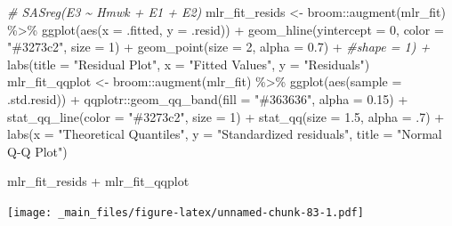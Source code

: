 \documentclass[
]{book}
\newenvironment{Shaded}{\begin{snugshade}}{\end{snugshade}}
\newcommand{\AttributeTok}[1]{\textcolor[rgb]{0.77,0.63,0.00}{#1}}
\newcommand{\CommentTok}[1]{\textcolor[rgb]{0.56,0.35,0.01}{\textit{#1}}}
\newcommand{\DecValTok}[1]{\textcolor[rgb]{0.00,0.00,0.81}{#1}}
\newcommand{\FloatTok}[1]{\textcolor[rgb]{0.00,0.00,0.81}{#1}}
\newcommand{\FunctionTok}[1]{\textcolor[rgb]{0.00,0.00,0.00}{#1}}
\newcommand{\NormalTok}[1]{#1}
\newcommand{\OtherTok}[1]{\textcolor[rgb]{0.56,0.35,0.01}{#1}}
\newcommand{\SpecialCharTok}[1]{\textcolor[rgb]{0.00,0.00,0.00}{#1}}
\newcommand{\StringTok}[1]{\textcolor[rgb]{0.31,0.60,0.02}{#1}}
\begin{document}
\begin{Shaded}
\begin{Highlighting}[]
\CommentTok{\# SASreg(E3 \textasciitilde{} Hmwk + E1 + E2)}
\NormalTok{mlr\_fit\_resids }\OtherTok{\textless{}{-}}\NormalTok{ broom}\SpecialCharTok{::}\FunctionTok{augment}\NormalTok{(mlr\_fit) }\SpecialCharTok{\%\textgreater{}\%} 
  \FunctionTok{ggplot}\NormalTok{(}\FunctionTok{aes}\NormalTok{(}\AttributeTok{x =}\NormalTok{ .fitted, }\AttributeTok{y =}\NormalTok{ .resid)) }\SpecialCharTok{+} 
  \FunctionTok{geom\_hline}\NormalTok{(}\AttributeTok{yintercept =} \DecValTok{0}\NormalTok{, }\AttributeTok{color =} \StringTok{"\#3273c2"}\NormalTok{, }\AttributeTok{size =} \DecValTok{1}\NormalTok{) }\SpecialCharTok{+}
  \FunctionTok{geom\_point}\NormalTok{(}\AttributeTok{size =} \DecValTok{2}\NormalTok{, }\AttributeTok{alpha =} \FloatTok{0.7}\NormalTok{) }\SpecialCharTok{+} \CommentTok{\#shape = 1) +}
  \FunctionTok{labs}\NormalTok{(}\AttributeTok{title =} \StringTok{"Residual Plot"}\NormalTok{, }
       \AttributeTok{x =} \StringTok{"Fitted Values"}\NormalTok{, }
       \AttributeTok{y =} \StringTok{"Residuals"}\NormalTok{)}
\NormalTok{mlr\_fit\_qqplot }\OtherTok{\textless{}{-}}\NormalTok{ broom}\SpecialCharTok{::}\FunctionTok{augment}\NormalTok{(mlr\_fit) }\SpecialCharTok{\%\textgreater{}\%} 
  \FunctionTok{ggplot}\NormalTok{(}\FunctionTok{aes}\NormalTok{(}\AttributeTok{sample =}\NormalTok{ .std.resid)) }\SpecialCharTok{+}
\NormalTok{  qqplotr}\SpecialCharTok{::}\FunctionTok{geom\_qq\_band}\NormalTok{(}\AttributeTok{fill =} \StringTok{"\#363636"}\NormalTok{, }\AttributeTok{alpha =} \FloatTok{0.15}\NormalTok{) }\SpecialCharTok{+}
  \FunctionTok{stat\_qq\_line}\NormalTok{(}\AttributeTok{color =} \StringTok{"\#3273c2"}\NormalTok{, }\AttributeTok{size =} \DecValTok{1}\NormalTok{) }\SpecialCharTok{+}
  \FunctionTok{stat\_qq}\NormalTok{(}\AttributeTok{size =} \FloatTok{1.5}\NormalTok{, }\AttributeTok{alpha =}\NormalTok{ .}\DecValTok{7}\NormalTok{) }\SpecialCharTok{+}
  \FunctionTok{labs}\NormalTok{(}\AttributeTok{x =} \StringTok{"Theoretical Quantiles"}\NormalTok{,}
       \AttributeTok{y =} \StringTok{"Standardized residuals"}\NormalTok{,}
       \AttributeTok{title =} \StringTok{"Normal Q{-}Q Plot"}\NormalTok{)}

\NormalTok{mlr\_fit\_resids }\SpecialCharTok{+}\NormalTok{ mlr\_fit\_qqplot}
\end{Highlighting}
\end{Shaded}

\texttt{[image: \_main\_files/figure-latex/unnamed-chunk-83-1.pdf]}
\end{document}
